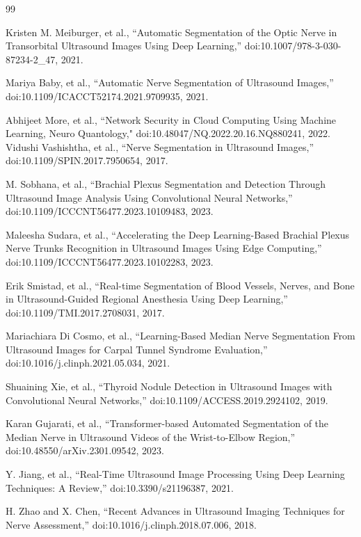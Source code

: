 \documentclass[12pt]{article}
\begin{document}
\begin{flushleft}
\begin{thebibliography}{99}

Kristen M. Meiburger, et al., ``Automatic Segmentation of the Optic Nerve in Transorbital Ultrasound Images Using Deep Learning,'' 
doi:10.1007/978-3-030-87234-2\_47, 2021.

Mariya Baby, et al., ``Automatic Nerve Segmentation of Ultrasound Images,'' 
doi:10.1109/ICACCT52174.2021.9709935, 2021.

Abhijeet More, et al., ``Network Security in Cloud Computing Using Machine Learning, Neuro Quantology,"
doi:10.48047/NQ.2022.20.16.NQ880241, 2022.
Vidushi Vashishtha, et al., ``Nerve Segmentation in Ultrasound Images,'' 
doi:10.1109/SPIN.2017.7950654, 2017.

M. Sobhana, et al., ``Brachial Plexus Segmentation and Detection Through Ultrasound Image Analysis Using Convolutional Neural Networks,'' 
doi:10.1109/ICCCNT56477.2023.10109483, 2023.

Maleesha Sudara, et al., ``Accelerating the Deep Learning-Based Brachial Plexus Nerve Trunks Recognition in Ultrasound Images Using Edge Computing,'' 
doi:10.1109/ICCCNT56477.2023.10102283, 2023.

Erik Smistad, et al., ``Real-time Segmentation of Blood Vessels, Nerves, and Bone in Ultrasound-Guided Regional Anesthesia Using Deep Learning,'' 
doi:10.1109/TMI.2017.2708031, 2017.

Mariachiara Di Cosmo, et al., ``Learning-Based Median Nerve Segmentation From Ultrasound Images for Carpal Tunnel Syndrome Evaluation,'' 
doi:10.1016/j.clinph.2021.05.034, 2021.

Shuaining Xie, et al., ``Thyroid Nodule Detection in Ultrasound Images with Convolutional Neural Networks,'' 
doi:10.1109/ACCESS.2019.2924102, 2019.

Karan Gujarati, et al., ``Transformer-based Automated Segmentation of the Median Nerve in Ultrasound Videos of the Wrist-to-Elbow Region,'' 
doi:10.48550/arXiv.2301.09542, 2023.

Y. Jiang, et al., ``Real-Time Ultrasound Image Processing Using Deep Learning Techniques: A Review,'' 
doi:10.3390/s21196387, 2021.

H. Zhao and X. Chen, ``Recent Advances in Ultrasound Imaging Techniques for Nerve Assessment,'' 
doi:10.1016/j.clinph.2018.07.006, 2018.


\end{thebibliography}
\end{flushleft}
\end{document}
